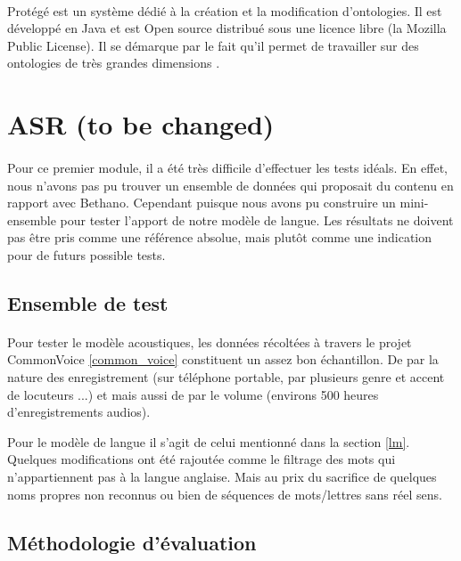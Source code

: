 		\paragraph{}
		Protégé est un système dédié à la création et la modification d'ontologies. Il est développé en Java et est Open source distribué sous une licence libre (la Mozilla Public License). Il se démarque par le fait qu'il permet de travailler sur des ontologies de très grandes dimensions 
		\cite{protege}.
		
		
\section{ASR (to be changed)}
\paragraph{}
Pour ce premier module, il a été très difficile d'effectuer les tests idéals. En effet, nous n'avons pas pu trouver un ensemble de données qui proposait du contenu en rapport avec Bethano. Cependant puisque nous avons pu construire un mini-ensemble pour tester l'apport de notre modèle de langue. Les résultats ne doivent pas être pris comme une référence absolue, mais plutôt comme une indication pour de futurs possible tests.
	\subsection{Ensemble de test}
	\paragraph{}
	Pour tester le modèle acoustiques, les données récoltées à travers le projet CommonVoice \ref{common_voice} constituent un assez bon échantillon. De par la nature des enregistrement (sur téléphone portable, par plusieurs genre et accent de locuteurs ...) et mais aussi de par le volume (environs 500 heures d'enregistrements audios). 
	\par
	Pour le modèle de langue il s'agit de celui mentionné dans la section \ref{lm}. Quelques modifications ont été rajoutée comme le filtrage des mots qui n'appartiennent pas à la langue anglaise. Mais au prix du sacrifice de quelques noms propres non reconnus ou bien de séquences de mots/lettres sans réel sens.
	\subsection{Méthodologie d'évaluation}

